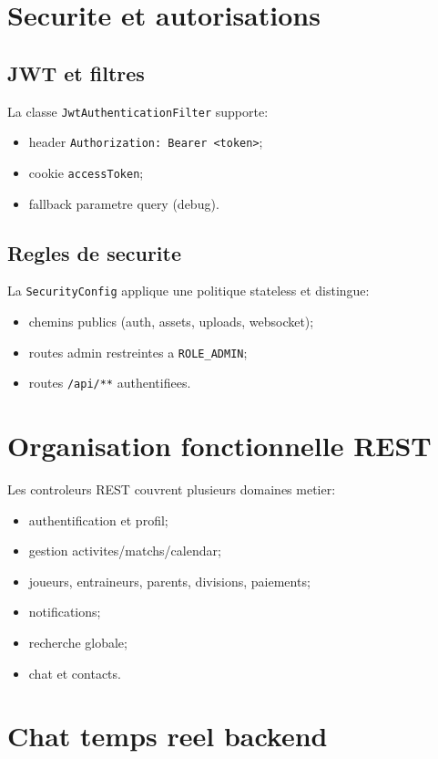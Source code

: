 \section{Securite et autorisations}

\subsection*{JWT et filtres}
La classe \texttt{JwtAuthenticationFilter} supporte:
\begin{itemize}[leftmargin=*]
  \item header \texttt{Authorization: Bearer <token>};
  \item cookie \texttt{accessToken};
  \item fallback parametre query (debug).
\end{itemize}

\subsection*{Regles de securite}
La \texttt{SecurityConfig} applique une politique stateless et distingue:
\begin{itemize}[leftmargin=*]
  \item chemins publics (auth, assets, uploads, websocket);
  \item routes admin restreintes a \texttt{ROLE\_ADMIN};
  \item routes \texttt{/api/**} authentifiees.
\end{itemize}

\section{Organisation fonctionnelle REST}

Les controleurs REST couvrent plusieurs domaines metier:
\begin{itemize}[leftmargin=*]
  \item authentification et profil;
  \item gestion activites/matchs/calendar;
  \item joueurs, entraineurs, parents, divisions, paiements;
  \item notifications;
  \item recherche globale;
  \item chat et contacts.
\end{itemize}

\section{Chat temps reel backend}

